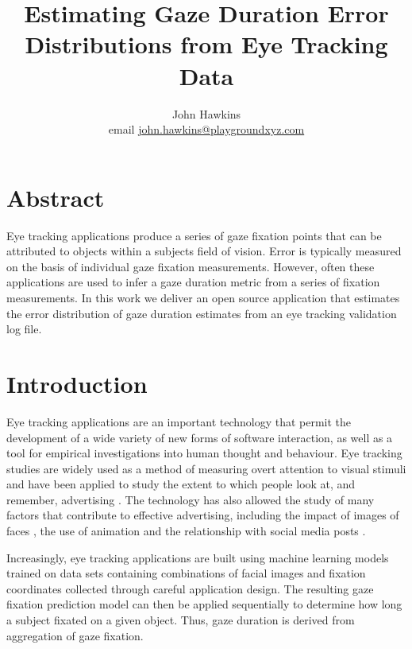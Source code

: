\documentclass[12pt,a4paper]{article}
\numberwithin{equation}{section}
\begin{document}
 
\title{Estimating Gaze Duration Error Distributions from Eye Tracking Data}

\author{
John Hawkins \\ email \href{mailto:john.hawkins@playgroundxyz.com}{john.hawkins@playgroundxyz.com} \\
} 

\maketitle

\section{Abstract}

Eye tracking applications produce a series of gaze fixation points that can be attributed to
objects within a subjects field of vision. Error is typically measured on the basis of individual
gaze fixation measurements. However, often these applications are used to infer a gaze duration
metric from a series of fixation measurements. In this work we deliver an open source application
that estimates the error distribution of gaze duration estimates from an eye tracking validation
log file.


\section{Introduction}

Eye tracking applications are an important technology that permit the development of a wide 
variety of new forms of software interaction, as well as a tool for empirical investigations 
into human thought and behaviour. Eye tracking studies are widely used as a method of 
measuring overt attention to visual stimuli and have been applied to study the extent to 
which people look at, and remember, advertising \cite{Hervet2011}.
The technology has also allowed the study of many factors that contribute to effective advertising,
including the impact of images of faces \cite{Djamasbi2010},
the use of animation \cite{Hamborg2012} and the relationship with
social media posts \cite{Barreto2013}.

Increasingly, eye tracking applications are built using machine learning models trained on 
data sets containing combinations of facial images and fixation coordinates collected 
through careful application design. The resulting gaze fixation prediction model can 
then be applied sequentially to determine how long a subject fixated on a given object.
Thus, gaze duration is derived from aggregation of gaze fixation.
\end{document}
